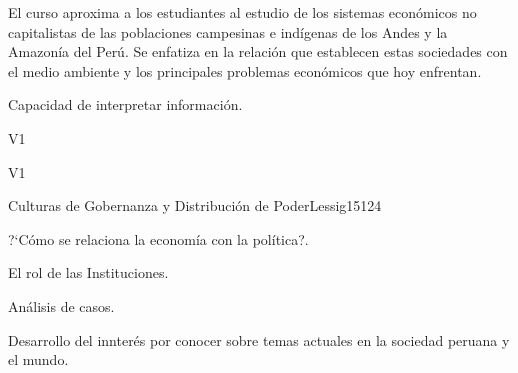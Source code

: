 \begin{syllabus}


\begin{justification}
El curso aproxima a los estudiantes al estudio de los sistemas económicos no capitalistas de las poblaciones campesinas e indígenas de los Andes y la Amazonía del Perú. Se enfatiza en la relación que establecen estas sociedades con el medio ambiente y los principales problemas económicos que hoy enfrentan.
\end{justification}

\begin{goals}
\item Capacidad de interpretar información.
\end{goals}

\begin{outcomes}{V1}
    \item {}
    \item {}
    \item {}
    
\end{outcomes}

\begin{competences}{V1}
    \item {}
    \item {}
    \item {}
    \item {}
\end{competences}

\begin{unit}{Culturas de Gobernanza y Distribución de Poder}{}{Lessig15}{12}{4}
   \begin{topics}
      \item ?`Cómo se relaciona la economía con la política?.
      \item El rol de las Instituciones.
      \item Análisis de casos.
   \end{topics}
   \begin{learningoutcomes}
      \item Desarrollo del innterés por conocer sobre temas actuales en la sociedad peruana y el mundo.
   \end{learningoutcomes}
\end{unit}

\begin{coursebibliography}
\end{coursebibliography}

\end{syllabus}
